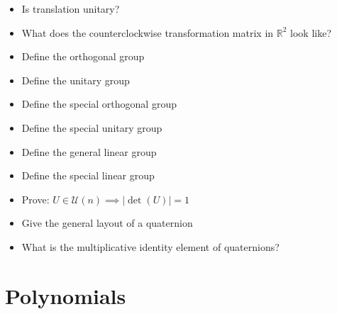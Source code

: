 \documentclass[a4paper]{article}
\newcommand{\card}[1]{\left|#1\right|}
\begin{document}
\begin{itemize}
  \item Is translation unitary?
  \item What does the counterclockwise transformation matrix in $\mathbb R^2$ look like?
  \item Define the orthogonal group
  \item Define the unitary group
  \item Define the special orthogonal group
  \item Define the special unitary group
  \item Define the general linear group
  \item Define the special linear group
  \item Prove: $U \in \mathcal U(n) \implies \card{\det(U)} = 1$
  \item Give the general layout of a quaternion
  \item What is the multiplicative identity element of quaternions?
\end{itemize}

\section{Polynomials}
\end{document}
